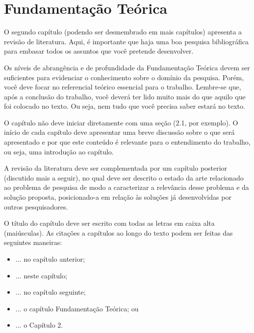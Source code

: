 
\chapter{Fundamentação Teórica}
\label{c_cap2}

O segundo capítulo (podendo ser desmembrado em mais capítulos) apresenta a revisão de literatura. Aqui, é importante que haja uma boa pesquisa bibliográfica para embasar todos os assuntos que você pretende desenvolver. 

Os níveis de abrangência e de profundidade da Fundamentação Teórica devem ser suficientes para evidenciar o conhecimento sobre o domínio da pesquisa. Porém, você deve focar no referencial teórico essencial para o trabalho. Lembre-se que, após a conclusão do trabalho, você deverá ter lido muito mais do que aquilo que foi colocado no texto. Ou seja, nem tudo que você precisa saber estará no texto. 

O capítulo não deve iniciar diretamente com uma seção (2.1, por exemplo). O início de cada capítulo deve apresentar uma breve discussão sobre o que será apresentado e por que este conteúdo é relevante para o entendimento do trabalho, ou seja, uma introdução ao capítulo.

A revisão da literatura deve ser complementada por um capítulo posterior (discutido mais a seguir), no qual deve ser descrito o estado da arte relacionado ao problema de pesquisa de modo a caracterizar a relevância desse problema e da solução proposta, posicionado-a em relação às soluções já desenvolvidas por outros pesquisadores.

O título do capítulo deve ser escrito com todas as letras em caixa alta (maiúsculas). As citações a capítulos ao longo do texto podem ser feitas das seguintes maneiras:

\begin{itemize}  
    \item ... no capítulo anterior;
    \item ... neste capítulo;
    \item ... no capítulo seguinte;
    \item ... o capítulo Fundamentação Teórica; ou
    \item ... o Capítulo 2.
\end{itemize}

